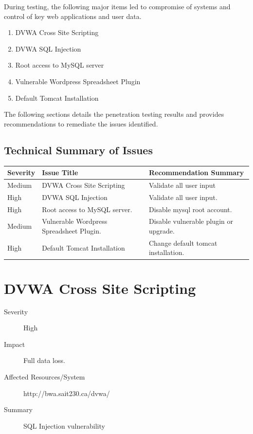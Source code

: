 \documentclass{article}
\begin{document}
During testing, the following major items led to compromise of systems and control
of key web applications and user data.

\begin{enumerate}
  \item DVWA Cross Site Scripting
  \item DVWA SQL Injection
  \item Root access to MySQL server
  \item Vulnerable Wordpress Spreadsheet Plugin
  \item Default Tomcat Installation
\end{enumerate}

The following sections details the penetration testing results and provides
recommendations to remediate the issues identified.

\subsection{Technical Summary of Issues}

\begin{center}
  \begin{tabular}{| l | l | | l |}
    \hline
    \textbf{Severity} & \textbf{Issue Title} & \textbf{Recommendation Summary} \\ \hline \hline
    Medium & DVWA Cross Site Scripting & Validate all user input \\ \hline
    High & DVWA SQL Injection & Validate all user input. \\ \hline
    High & Root access to MySQL server. & Disable mysql root account. \\ \hline
    Medium & Vulnerable Wordpress Spreadsheet Plugin. & Disable vulnerable plugin or upgrade. \\ \hline
    High & Default Tomcat Installation & Change default tomcat installation. \\ \hline
    \hline
  \end{tabular}
\end{center}

\newpage
\section{DVWA Cross Site Scripting}

\begin{description}
  \item[Severity] High
  \item[Impact] Full data loss.
  \item[Affected Resources/System] http://bwa.sait230.ca/dvwa/
  \item[Summary] SQL Injection vulnerability
\end{description}
\end{document}
